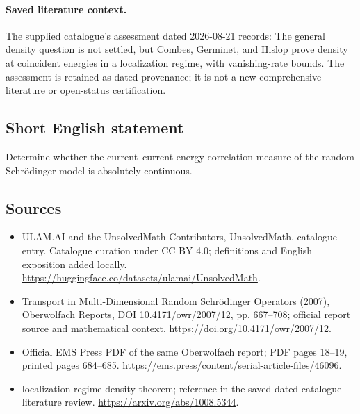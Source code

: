 \documentclass[11pt]{article}
\begin{document}
\paragraph{Saved literature context.} The supplied catalogue's assessment dated 2026-08-21 records: The general density question is not settled, but Combes, Germinet, and Hislop prove density at coincident energies in a localization regime, with vanishing-rate bounds. The assessment is retained as dated provenance; it is not a new comprehensive literature or open-status certification.
\subsection{Short English statement}
Determine whether the current--current energy correlation measure of the random Schrödinger model is absolutely continuous.
\subsection{Sources}
\begin{itemize}
\item[\hypertarget{source:statement:1}{S1}] ULAM.AI and the UnsolvedMath Contributors, UnsolvedMath, catalogue entry. Catalogue curation under CC BY 4.0; definitions and English exposition added locally.
\url{https://huggingface.co/datasets/ulamai/UnsolvedMath}.
\item[\hypertarget{source:statement:2}{S2}] Transport in Multi-Dimensional Random Schrödinger Operators (2007), Oberwolfach Reports, DOI 10.4171/owr/2007/12, pp. 667--708; official report source and mathematical context.
\url{https://doi.org/10.4171/owr/2007/12}.
\item[\hypertarget{source:statement:3}{S3}] Official EMS Press PDF of the same Oberwolfach report; PDF pages 18--19, printed pages 684--685.
\url{https://ems.press/content/serial-article-files/46096}.
\item[\hypertarget{source:statement:4}{S4}] localization-regime density theorem; reference in the saved dated catalogue literature review.
\url{https://arxiv.org/abs/1008.5344}.
\end{itemize}
\label{end:statement}
\end{document}
